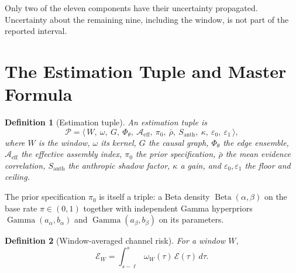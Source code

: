 \documentclass[11pt]{article}
\newtheorem{definition}{Definition}[section]
\theoremstyle{remark}
\DeclareMathOperator{\Beta}{Beta}
\DeclareMathOperator{\Gam}{Gamma}
\newcommand{\Aeff}{\mathcal{A}_{\mathrm{eff}}}
\newcommand{\Santh}{S_{\mathrm{anth}}}
\newcommand{\rhobar}{\bar{\rho}}
\newcommand{\eone}{\varepsilon_1}
\newcommand{\ezero}{\varepsilon_0}
\begin{document}
Only two of the eleven components have their uncertainty propagated. Uncertainty about the remaining nine, including the window, is not part of the reported interval.


\section{The Estimation Tuple and Master Formula}\label{sec:tuple}

\begin{definition}[Estimation tuple]\label{def:tuple}
An \emph{estimation tuple} is
\begin{equation}
\mathcal{P}=\bigl\langle\,W,\ \omega,\ G,\ \Phi_\theta,\ \Aeff,\ \pi_0,\ \rhobar,\ \Santh,\ \kappa,\ \ezero,\ \eone\,\bigr\rangle,
\end{equation}
where $W$ is the window, $\omega$ its kernel, $G$ the causal graph, $\Phi_\theta$ the edge ensemble, $\Aeff$ the effective assembly index, $\pi_0$ the prior specification, $\rhobar$ the mean evidence correlation, $\Santh$ the anthropic shadow factor, $\kappa$ a gain, and $\ezero,\eone$ the floor and ceiling.
\end{definition}

The prior specification $\pi_0$ is itself a triple: a Beta density $\Beta(\alpha,\beta)$ on the base rate $\pi\in(0,1)$ together with independent Gamma hyperpriors $\Gam(a_\alpha,b_\alpha)$ and $\Gam(a_\beta,b_\beta)$ on its parameters.

\begin{definition}[Window-averaged channel risk]\label{def:EW}
For a window $W$,
\begin{equation}
\mathcal{E}_W=\int_{s-\ell}^{s}\omega_W(\tau)\,\mathcal{E}(\tau)\,d\tau .
\end{equation}
\end{definition}
\end{document}
